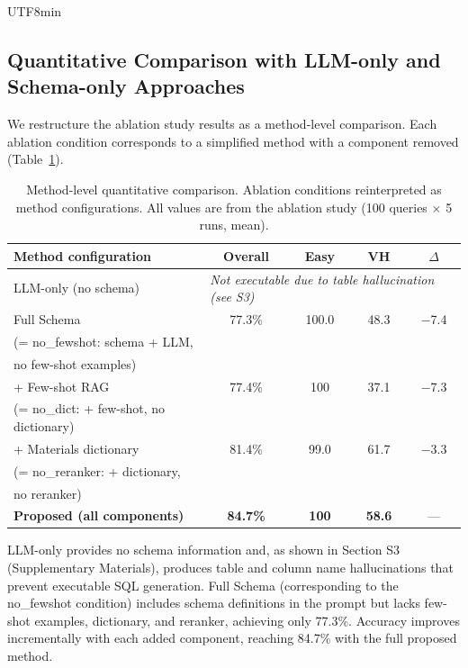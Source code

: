 \documentclass[sn-mathphys,Numbered]{sn-jnl}
\begin{document}
\begin{CJK}{UTF8}{min}
\subsection{Quantitative Comparison with LLM-only and Schema-only Approaches}

We restructure the ablation study results as a method-level
comparison.
Each ablation condition corresponds to a simplified method with
a component removed (Table~\ref{tab:method_comparison}).

\begin{table}[t]
\centering
\caption{Method-level quantitative comparison. Ablation conditions reinterpreted
as method configurations. All values are from the ablation study (100 queries $\times$ 5 runs, mean).}
\label{tab:method_comparison}
\small
\begin{tabular}{@{}p{4.2cm}cccc@{}}
\toprule
Method configuration & Overall & Easy & VH & $\Delta$ \\
\midrule
LLM-only (no schema) & \multicolumn{4}{l}{\textit{Not executable due to table hallucination (see S3)}} \\
\midrule
Full Schema & 77.3\% & 100.0 & 48.3 & $-$7.4  \\
{\scriptsize (= no\_fewshot: schema + LLM,} & & & & \\
{\scriptsize \phantom{(= }no few-shot examples)} & & & & \\
\midrule
+ Few-shot RAG & 77.4\% & 100 & 37.1 & $-$7.3 \\
{\scriptsize (= no\_dict: + few-shot, no dictionary)} & & & & \\
\midrule
+ Materials dictionary & 81.4\% & 99.0 & 61.7 & $-$3.3 \\
{\scriptsize (= no\_reranker: + dictionary,} & & & & \\
{\scriptsize \phantom{(= }no reranker)} & & & & \\
\midrule
\textbf{Proposed (all components)} & \textbf{84.7\%} & \textbf{100} & \textbf{58.6} & --- \\
\bottomrule
\end{tabular}
\end{table}

LLM-only provides no schema information and, as shown in Section
S3 (Supplementary Materials), produces table and column name
hallucinations that prevent executable SQL generation.
Full Schema (corresponding to the no\_fewshot condition) includes
schema definitions in the prompt but lacks few-shot examples,
dictionary, and reranker, achieving only 77.3\%.
Accuracy improves incrementally with each added component,
reaching 84.7\% with the full proposed method.


\end{CJK}
\end{document}
